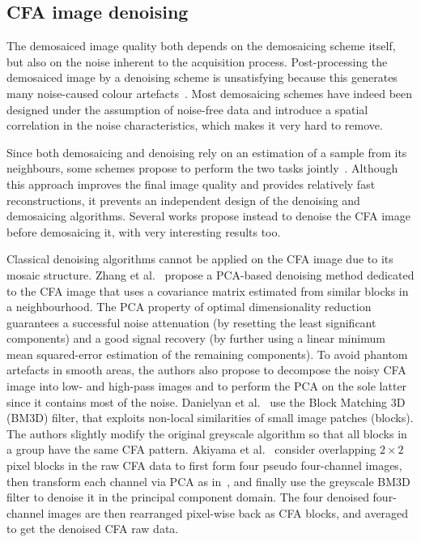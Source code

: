 \documentclass[twoside]{article}
\begin{document}
\subsection{CFA image denoising}
\label{subsec:denoising}

The demosaiced image quality both depends on the demosaicing scheme itself, but also on the noise inherent to the acquisition process. Post-processing the demosaiced image by a denoising scheme is unsatisfying because this generates many noise-caused colour artefacts~\cite{zhang_ip_2009}. Most demosaicing schemes have indeed been designed under the assumption of noise-free data and introduce a spatial correlation in the noise characteristics, which makes it very hard to remove.

Since both demosaicing and denoising rely on an estimation of a sample from its neighbours, some schemes propose to perform the two tasks jointly~\cite{condat_icip_2012,goossens_icip_2013,khashabi_ip_2014}. Although this approach improves the final image quality and provides relatively fast reconstructions, it prevents an independent design of the denoising and demosaicing algorithms. Several works propose instead to denoise the CFA image before demosaicing it, with very interesting results too.

Classical denoising algorithms cannot be applied on the CFA image due to its mosaic structure. Zhang et al.~\cite{zhang_ip_2009} propose a PCA-based denoising method dedicated to the CFA image that uses a covariance matrix estimated from similar blocks in a neighbourhood. The PCA property of optimal dimensionality reduction guarantees a successful noise attenuation (by resetting the least significant components) and a good signal recovery (by further using a linear minimum mean squared-error estimation of the remaining components). To avoid phantom artefacts in smooth areas, the authors also propose to decompose the noisy CFA image into low- and high-pass images and to perform the PCA on the sole latter since it contains most of the noise.
Danielyan et al.~\cite{danielyan_lnla_2009} use the Block Matching 3D (BM3D) filter, that exploits non-local similarities of small image patches (blocks). The authors slightly modify the original greyscale algorithm so that all blocks in a group have the same CFA pattern. 
Akiyama et al.~\cite{akiyama_icip_2015} consider overlapping $2 \times 2$ pixel blocks in the raw CFA data to first form four pseudo four-channel images, then transform each channel via PCA as in~\cite{zhang_ip_2009}, and finally use the greyscale BM3D filter to denoise it in the principal component domain. The four denoised four-channel images are then rearranged pixel-wise back as CFA blocks, and averaged to get the denoised CFA raw data.
\end{document}
